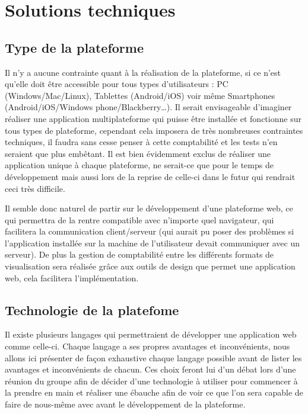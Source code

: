 \section{Solutions techniques}
\label{sec:technique}

    \subsection{Type de la plateforme}
    \label{subsec:plateforme}
    Il n’y a aucune contrainte quant à la réalisation de la plateforme, si ce n’est qu’elle doit être accessible pour tous types
    d’utilisateurs : PC (Windows/Mac/Linux), Tablettes (Android/iOS) voir même Smartphones (Android/iOS/Windows phone/Blackberry…).
    Il serait envisageable d’imaginer réaliser une application multiplateforme qui puisse être installée et fonctionne sur tous
    types de plateforme, cependant cela imposera de très nombreuses contraintes techniques, il faudra sans cesse penser à cette
    comptabilité et les tests n’en seraient que plus embêtant. Il est bien évidemment exclus de réaliser une application unique
    à chaque plateforme, ne serait-ce que pour le temps de développement mais aussi lors de la reprise de celle-ci dans le futur
    qui rendrait ceci très difficile.

    Il semble donc naturel de partir sur le développement d’une plateforme web, ce qui permettra de la rentre compatible avec
    n’importe quel navigateur, qui facilitera la communication client/serveur (qui aurait pu poser des problèmes si l’application
    installée sur la machine de l’utilisateur devait communiquer avec un serveur). De plus la gestion de comptabilité entre les
    différents formats de visualisation sera réalisée grâce aux outils de design que permet une application web, cela facilitera
    l’implémentation.

    \subsection{Technologie de la platefome}
    \label{subsec:technologie}
    Il existe plusieurs langages qui permettraient de développer une application web comme
    celle-ci. Chaque langage a ses propres avantages et inconvénients, nous allons ici présenter de façon
    exhaustive chaque langage possible avant de lister les avantages et inconvénients de chacun. Ces
    choix feront lui d’un débat lors d’une réunion du groupe afin de décider d’une technologie à utiliser
    pour commencer à la prendre en main et réaliser une ébauche afin de voir ce que l’on sera capable
    de faire de nous-même avec avant le développement de la plateforme.

